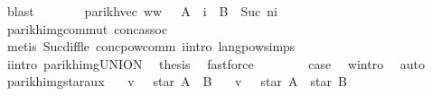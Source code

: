 \begin{isabellebody}
\ blast\isanewline
\ \ \ \ \isamarkupfalse%
\ \isamarkupfalse%
\ {\isachardoublequoteopen}parikh{\isacharunderscore}{\kern0pt}vec\ {\isacharparenleft}{\kern0pt}w{}{\isacharat}{\kern0pt}w{}{\isacharprime}{\kern0pt}{\isacharparenright}{\kern0pt}\ {\isasymin}\ {\isasymPsi}\ {\isacharparenleft}{\kern0pt}A\ {\isacharcircum}{\kern0pt}{\isacharcircum}{\kern0pt}\ i\ {\isacharat}{\kern0pt}{\isacharat}{\kern0pt}\ B\ {\isacharcircum}{\kern0pt}{\isacharcircum}{\kern0pt}\ {\isacharparenleft}{\kern0pt}Suc\ n{\isacharminus}{\kern0pt}i{\isacharparenright}{\kern0pt}{\isacharparenright}{\kern0pt}{\isachardoublequoteclose}\isanewline
\ \ \ \ \ \ \isamarkupfalse%
\ parikh{\isacharunderscore}{\kern0pt}img{\isacharunderscore}{\kern0pt}commut\ conc{\isacharunderscore}{\kern0pt}assoc\isanewline
\ \ \ \ \ \ \isamarkupfalse%
\ {\isacharparenleft}{\kern0pt}metis\ Suc{\isacharunderscore}{\kern0pt}diff{\isacharunderscore}{\kern0pt}le\ conc{\isacharunderscore}{\kern0pt}pow{\isacharunderscore}{\kern0pt}comm\ i{\isacharunderscore}{\kern0pt}intro\ lang{\isacharunderscore}{\kern0pt}pow{\isachardot}{\kern0pt}simps{\isacharparenleft}{\kern0pt}{}{\isacharparenright}{\kern0pt}{\isacharparenright}{\kern0pt}\isanewline
\ \ \ \ \isamarkupfalse%
\ i{\isacharunderscore}{\kern0pt}intro\ parikh{\isacharunderscore}{\kern0pt}img{\isacharunderscore}{\kern0pt}UNION\ \isamarkupfalse%
\ {\isacharquery}{\kern0pt}thesis\ \isamarkupfalse%
\ fastforce\isanewline
\ \ \isamarkupfalse%
\isanewline
\ \ \isamarkupfalse%
\ \isamarkupfalse%
\ {\isacharquery}{\kern0pt}case\ \isamarkupfalse%
\ w{\isacharunderscore}{\kern0pt}intro\ \isamarkupfalse%
\ auto\isanewline
{}\isamarkupfalse%
%
\endisatagproof
{\isafoldproof}%
%
\isadelimproof
\isanewline
%
\endisadelimproof
\isanewline
{}\isamarkupfalse%
\ parikh{\isacharunderscore}{\kern0pt}img{\isacharunderscore}{\kern0pt}star{\isacharunderscore}{\kern0pt}aux{}{\isacharcolon}{\kern0pt}\isanewline
\ \ \ {\isachardoublequoteopen}v\ {\isasymin}\ {\isasymPsi}\ {\isacharparenleft}{\kern0pt}star\ {\isacharparenleft}{\kern0pt}A\ {\isasymunion}\ B{\isacharparenright}{\kern0pt}{\isacharparenright}{\kern0pt}{\isachardoublequoteclose}\isanewline
\ \ \ {\isachardoublequoteopen}v\ {\isasymin}\ {\isasymPsi}\ {\isacharparenleft}{\kern0pt}star\ A\ {\isacharat}{\kern0pt}{\isacharat}{\kern0pt}\ star\ B{\isacharparenright}{\kern0pt}{\isachardoublequoteclose}\isanewline

\end{isabellebody}
